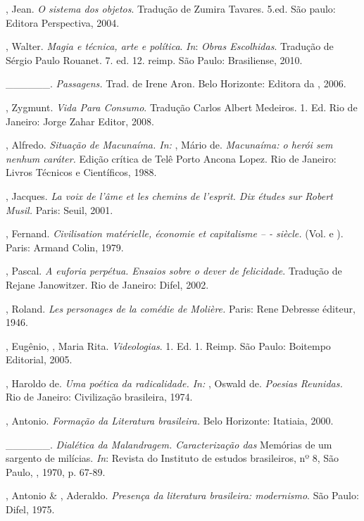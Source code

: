 \begin{Parskip}
, Jean. \emph{O sistema dos objetos}. Tradução de
Zumira Tavares. 5.ed. São paulo: Editora Perspectiva, 2004.

, Walter. \emph{Magia e técnica, arte e política}. \emph{In}: \emph{Obras
Escolhidas}. Tradução de Sérgio Paulo Rouanet. 7. ed. 12. reimp. São Paulo: Brasiliense, 2010.

\_\_\_\_\_\_. \emph{Passagens.} Trad. de Irene Aron. Belo Horizonte:
Editora da , 2006.

, Zygmunt. \emph{Vida Para Consumo}. Tradução Carlos Albert
Medeiros. 1. Ed. Rio de Janeiro: Jorge Zahar Editor, 2008.

, Alfredo. \emph{Situação de Macunaíma. In:} , Mário de.
\emph{Macunaíma: o herói sem nenhum caráter.} Edição crítica de Telê
Porto Ancona Lopez. Rio de Janeiro: Livros Técnicos e Científicos, 1988.

, Jacques. \emph{La voix de l'âme et les chemins de
l'esprit. Dix études sur Robert Musil.} Paris: Seuil, 2001.

, Fernand. \emph{Civilisation matérielle, économie et
capitalisme -- - siècle.} (Vol.  e ). Paris: Armand Colin, 1979.

, Pascal. \emph{A euforia perpétua. Ensaios sobre o dever de
felicidade}. Tradução de Rejane Janowitzer. Rio de Janeiro: Difel, 2002.

, Roland. \emph{Les personages de la comédie de Molière.}
Paris: Rene Debresse éditeur, 1946.

, Eugênio, , Maria Rita. \emph{Videologias}. 1. Ed. 1.
Reimp. São Paulo: Boitempo Editorial, 2005.

, Haroldo de. \emph{Uma poética da radicalidade. In:} ,
Oswald de. \emph{Poesias Reunidas.} Rio de Janeiro: Civilização brasileira, 1974.

, Antonio. \emph{Formação da Literatura brasileira.} Belo
Horizonte: Itatiaia, 2000.

\_\_\_\_\_\_. \emph{Dialética da Malandragem. Caracterização das}
Memórias de um sargento de milícias. \emph{In}: Revista do Instituto de
estudos brasileiros, nº 8, São Paulo, , 1970, p. 67-89.

, Antonio \& , Aderaldo. \emph{Presença da literatura
brasileira: modernismo}. São Paulo: Difel, 1975.


\end{Parskip}
